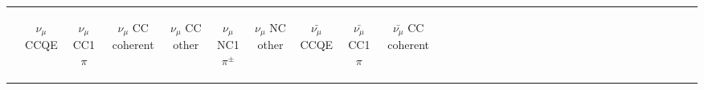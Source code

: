% 
% 

%
%


%
%


%
% 

%
%

{
\setlength{\tabcolsep}{3pt}
\renewcommand{\arraystretch}{1.8}
\begin{table}
\tiny
\centering
\begin{tabular}{| c || c | c | c | c | c | c || c | c | c | c | c | c || c | c | c | c | c | c || c | c | c | c | c | c || c | c | c | c || c | c | c | c |}
\hline
                       & \begin{sideways}   $\nu_{\mu}$ CCQE                   \end{sideways}  &   
                         \begin{sideways}   $\nu_{\mu}$ CC1$\pi$               \end{sideways}  &   
                         \begin{sideways}   $\nu_{\mu}$ CC coherent            \end{sideways}  &   
                         \begin{sideways}   $\nu_{\mu}$ CC other               \end{sideways}  &   
                         \begin{sideways}   $\nu_{\mu}$ NC1$\pi^{\pm}$         \end{sideways}  &  
                         \begin{sideways}   $\nu_{\mu}$ NC other               \end{sideways}  &   
                         \begin{sideways}   $\bar{\nu_{\mu}}$ CCQE             \end{sideways}  &  
                         \begin{sideways}   $\bar{\nu_{\mu}}$ CC1$\pi$         \end{sideways}  &  
                         \begin{sideways}   $\bar{\nu_{\mu}}$ CC coherent      \end{sideways}  &  

\end{tabular}
\end{table}}
